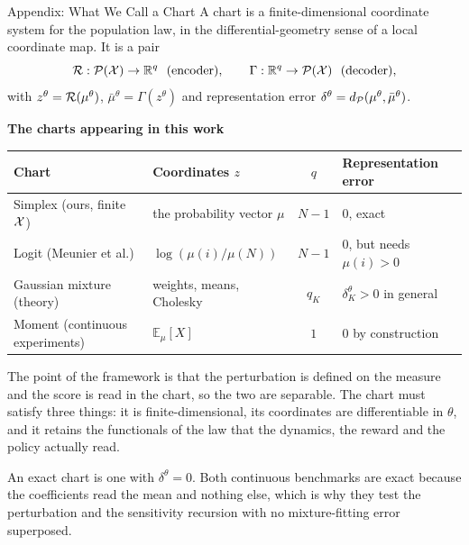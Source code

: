 \documentclass[9pt]{beamer}
\def\Xc{{\cal X}}
\def\Pc{{\cal P}}
\def\Rc{{\cal R}}
\def\E{{\mathbb E}}
\def\R{{\mathbb R}}
\newcommand{\exhibittitle}[1]{%
  \begin{center}{\small\bfseries\color{Xblue}#1}\end{center}%
  \vspace{-0.28cm}}
\newenvironment{exhibit}[1]{%
  \exhibittitle{#1}%
  \par\vspace{0.05cm}\begin{center}}%
  {\end{center}\vspace{-0.15cm}}
\begin{document}
\begin{frame}{Appendix: What We Call a Chart}
\small
A chart is a finite-dimensional coordinate system for the population law, in the differential-geometry sense of a local coordinate map. It is a pair
\[
  \Rc:\Pc(\Xc)\to\R^{q}\ \ \text{(encoder)},
  \qquad
  \Gamma:\R^{q}\to\Pc(\Xc)\ \ \text{(decoder)},
\]
with $z^\theta=\Rc(\mu^\theta)$, $\bar\mu^\theta=\Gamma(z^\theta)$ and representation error $\delta^\theta=d_\Pc(\mu^\theta,\bar\mu^\theta)$.

\vspace{0.15cm}
\scriptsize
\begin{exhibit}{The charts appearing in this work}
\begin{tabular}{llcl}
\toprule
Chart & Coordinates $z$ & $q$ & Representation error \\
\midrule
Simplex (ours, finite $\Xc$)   & the probability vector $\mu$ & $N-1$ & $0$, exact \\
Logit (Meunier et al.)         & $\log(\mu(i)/\mu(N))$        & $N-1$ & $0$, but needs $\mu(i)>0$ \\
Gaussian mixture (theory)      & weights, means, Cholesky     & $q_K$ & $\delta_K^\theta>0$ in general \\
Moment (continuous experiments)& $\E_\mu[X]$                  & $1$   & $0$ by construction \\
\bottomrule
\end{tabular}
\end{exhibit}

\vspace{0.1cm}
\small
The point of the framework is that the perturbation is defined on the measure and the score is read in the chart, so the two are separable. The chart must satisfy three things: it is finite-dimensional, its coordinates are differentiable in $\theta$, and it retains the functionals of the law that the dynamics, the reward and the policy actually read.

\vspace{0.1cm}
An exact chart is one with $\delta^\theta=0$. Both continuous benchmarks are exact because the coefficients read the mean and nothing else, which is why they test the perturbation and the sensitivity recursion with no mixture-fitting error superposed.
\end{frame}
\end{document}
